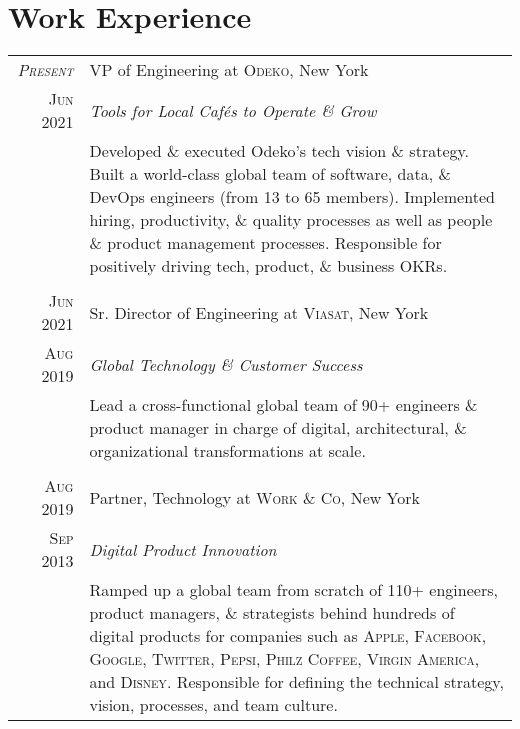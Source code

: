 \documentclass[a4paper,10pt]{article}
\begin{document}
\section{Work Experience}
\begin{tabular}{r|p{14cm}}
  \textsc{\emph{Present}} & VP of Engineering at \textsc{Odeko}, New York \\

  \textsc{Jun 2021} & \emph{Tools for Local Caf\'{e}s to Operate \& Grow}\\

  &\footnotesize{Developed \& executed Odeko's tech vision \&
    strategy. Built a world-class global team of software, data, \&
    DevOps engineers (from 13 to 65 members). Implemented hiring,
    productivity, \& quality processes as well as people \& product
    management processes. Responsible for positively driving tech,
    product, \& business OKRs.}\\

  \multicolumn{2}{c}{}\\

  \textsc{Jun 2021} & Sr. Director of Engineering at \textsc{Viasat}, New York \\

  \textsc{Aug 2019} & \emph{Global Technology \& Customer Success}\\

  &\footnotesize{Lead a cross-functional global team of 90+
    engineers \& product manager in charge of digital, architectural,
    \& organizational transformations at scale.}\\

  \multicolumn{2}{c}{}\\

  \textsc{Aug 2019} & Partner, Technology at \textsc{Work \& Co}, New York \\

  \textsc{Sep 2013} & \emph{Digital Product Innovation}\\

  &\footnotesize{Ramped up a global team from scratch of 110+
    engineers, product managers, \& strategists behind hundreds of
    digital products for companies such as \textsc{Apple},
    \textsc{Facebook}, \textsc{Google}, \textsc{Twitter},
    \textsc{Pepsi}, \textsc{Philz Coffee}, \textsc{Virgin America},
    and \textsc{Disney}. Responsible for defining the technical
    strategy, vision, processes, and team culture.}\\


\end{tabular}
\end{document}
